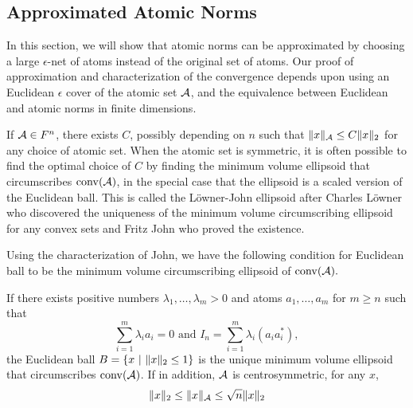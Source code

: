 

\subsection{Approximated Atomic Norms} %
\label{sub:approximated_atomic_norms}

In this section, we will show that atomic norms can be approximated by choosing
a large $\epsilon$-net of atoms instead of the original set of atoms. Our proof
of approximation and characterization of the convergence depends upon using an
Euclidean $\epsilon$ cover of the atomic set $\mathcal{A}$, and the equivalence between
Euclidean and atomic norms in finite dimensions.

If $\mathcal{A} \in F^n$, there exists $C$, possibly depending on $n$ such that
$\lVert x\rVert_{\mathcal{A}} \leq C \lVert x\rVert_2$ for any choice of atomic set. When the atomic
set is symmetric, it is often possible to find the optimal choice of $C$ by
finding the minimum volume ellipsoid that circumscribes $\operatorname{conv}(\mathcal{A})$, in the
special case that the ellipsoid is a scaled version of the Euclidean ball. This
is called the L\"{o}wner-John ellipsoid after Charles L\"{o}wner who discovered
the uniqueness of the minimum volume circumscribing ellipsoid for any convex
sets and Fritz John who proved the existence.

Using the characterization of John, we have the following condition for
Euclidean ball to be the minimum volume circumscribing ellipsoid of $\operatorname{conv}(\mathcal{A}).$

\begin{theorem}\label{thm:john:ellipsoid}
If there exists positive numbers $\lambda_1, \dots, \lambda_m >0$ and atoms
$a_1, \dots, a_m$ for $m \geq n$ such that
\[
		\sum_{i=1}^m \lambda_i a_i = 0 \text{ and } I_n = \sum_{i=1}^m \lambda_i (a_i a_i^*),
\]
the Euclidean ball $B=\left\{ x ~\middle|~ \lVert x\rVert_2 \leq 1 \right\}$ is the unique minimum
volume ellipsoid that circumscribes $\operatorname{conv}(\mathcal{A})$. If in addition, $\mathcal{A}$ is
centrosymmetric, for any $x$,
\[
	\lVert x\rVert_2 \leq \lVert x\rVert_{\mathcal{A}}  \leq \sqrt{n} \lVert x\rVert_2 
\]	
\end{theorem}

